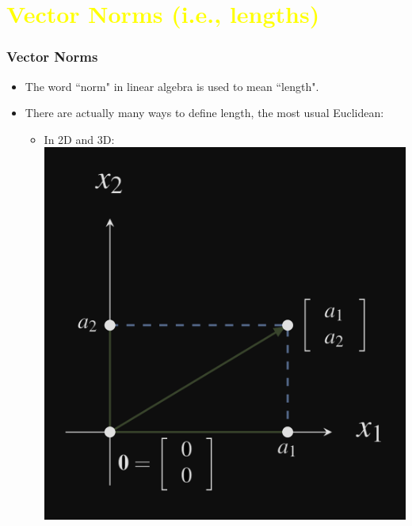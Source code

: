 \documentclass[pdf,9pt]{beamer}
\begin{document}
\section[\textcolor{yellow}{}]{\textcolor{yellow}{Vector Norms (i.e., lengths)}}
\begin{frame}
    \frametitle{Vector Norms}
    \pause
    \begin{itemize}
	\item
	    The word ``norm" in linear algebra is used to mean ``length".
	\item
	    There are actually many ways to define length, the most usual Euclidean:
	    \begin{itemize}
		\item
		    In 2D and 3D: \\[3pt]
	\includegraphics[scale=0.09]{R2.png}
	\hfill

\end{itemize}
\end{itemize}
\end{frame}
\end{document}
